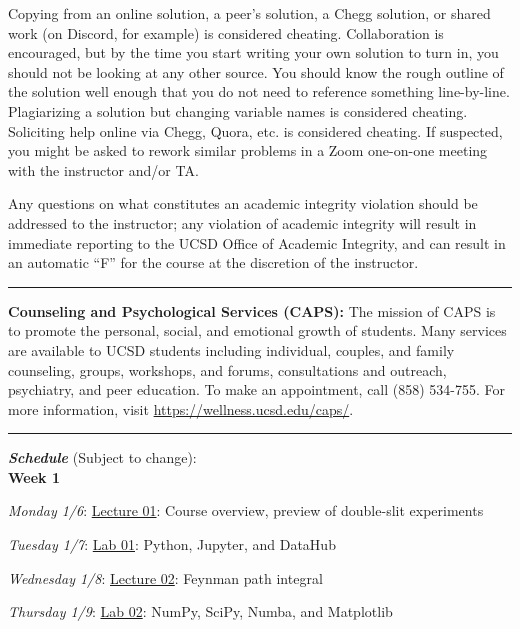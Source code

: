 \documentclass[12pt]{article}
\begin{document}
Copying from an online solution, a peer's solution, a Chegg solution, or shared work (on Discord, for example) is considered cheating.
Collaboration is encouraged, but by the time you start writing your own solution to turn in, you should not be looking at any other source.
You should know the rough outline of the solution well enough that you do not need to reference something line-by-line.
Plagiarizing a solution but changing variable names is considered cheating.
Soliciting help online via Chegg, Quora, etc. is considered cheating.
If suspected, you might be asked to rework similar problems in a Zoom one-on-one meeting with the instructor and/or TA.

Any questions on what constitutes an academic integrity violation should be addressed to the instructor; any violation of academic integrity will result in immediate reporting to the UCSD Office of Academic Integrity, and can result in an automatic ``F'' for the course at the discretion of the instructor.

\begin{center}
  \rule{\textwidth}{0.5pt}
\end{center}

\noindent\textbf{Counseling and Psychological Services (CAPS):} The mission of CAPS is to promote the personal, social, and emotional growth of students.
Many services are available to UCSD students including individual, couples, and family counseling, groups, workshops, and forums, consultations and outreach, psychiatry, and peer education.
To make an appointment, call (858) 534-755.
For more information, visit \href{https://wellness.ucsd.edu/caps/}{https://wellness.ucsd.edu/caps/}.

\begin{center}
  \rule{\textwidth}{0.5pt}
\end{center}

\noindent\textbf{\emph{Schedule}} (Subject to change):\\

\noindent\textbf{Week 1}

\emph{Monday 1/6}: \underline{Lecture 01}: Course overview, preview of double-slit experiments

\emph{Tuesday 1/7}: \underline{Lab 01}: Python, Jupyter, and DataHub

\emph{Wednesday 1/8}: \underline{Lecture 02}: Feynman path integral

\emph{Thursday 1/9}: \underline{Lab 02}: NumPy, SciPy, Numba, and Matplotlib
\end{document}

